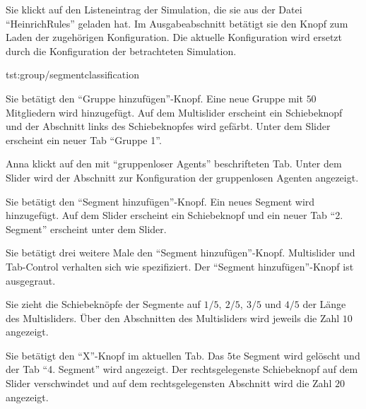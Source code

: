 \documentclass[parskip=full,11pt]{scrartcl}
\begin{document}
{Sie klickt auf den Listeneintrag der Simulation, die sie aus der Datei \enquote{HeinrichRules} geladen hat. Im Ausgabeabschnitt betätigt sie den Knopf zum Laden der zugehörigen \Gls{Konfiguration}.}
{Die \Gls{aktuelle Konfiguration} wird ersetzt durch die \Gls{Konfiguration} der betrachteten Simulation.}

{tst:group/segmentclassification}

{Sie betätigt den \enquote{Gruppe hinzufügen}-Knopf.}
{Eine neue Gruppe mit \(50\) Mitgliedern wird hinzugefügt. Auf dem \Gls{Multislider} erscheint ein Schiebeknopf und der Abschnitt links des Schiebeknopfes wird gefärbt. Unter dem Slider erscheint ein neuer Tab \enquote{Gruppe 1}.}

{Anna klickt auf den mit \enquote{\Glspl{gruppenloser Agent}} beschrifteten Tab.}
{Unter dem Slider wird der Abschnitt zur \Gls{Konfiguration} der gruppenlosen Agenten angezeigt.}

{Sie betätigt den \enquote{Segment hinzufügen}-Knopf.}
{Ein neues Segment wird hinzugefügt. Auf dem Slider erscheint ein Schiebeknopf und ein neuer Tab \enquote{2. Segment} erscheint unter dem Slider.}

{Sie betätigt drei weitere Male den \enquote{Segment hinzufügen}-Knopf.}
{\Gls{Multislider} und Tab-Control verhalten sich wie spezifiziert. Der \enquote{Segment hinzufügen}-Knopf ist ausgegraut.}

{Sie zieht die Schiebeknöpfe der Segmente auf \(1/5,\ 2/5,\ 3/5 \text{ und } 4/5\) der Länge des \Glspl{Multislider}.}
{Über den Abschnitten des \Glspl{Multislider} wird jeweils die Zahl \(10\) angezeigt.}

{Sie betätigt den \enquote{X}-Knopf im aktuellen Tab.}
{Das \(5\)te Segment wird gelöscht und der Tab \enquote{4. Segment} wird angezeigt. Der rechtsgelegenste Schiebeknopf auf dem Slider verschwindet und auf dem rechtsgelegensten Abschnitt wird die Zahl \(20\) angezeigt.}
\end{document}
